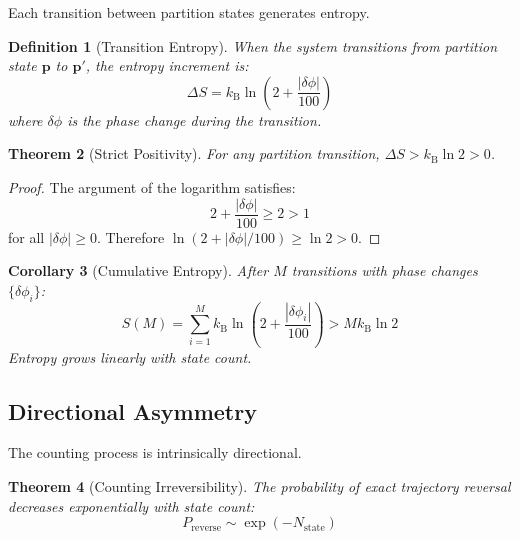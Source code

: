 \documentclass[twocolumn,10pt]{article}
\newtheorem{theorem}{Theorem}[section]
\newtheorem{corollary}[theorem]{Corollary}
\newtheorem{definition}[theorem]{Definition}
\newcommand{\kB}{k_{\mathrm{B}}}
\newcommand{\Nstate}{N_{\mathrm{state}}}
\begin{document}
Each transition between partition states generates entropy.

\begin{definition}[Transition Entropy]
\label{def:entropy}
When the system transitions from partition state $\mathbf{p}$ to $\mathbf{p}'$, the entropy increment is:
\begin{equation}
    \Delta S = \kB \ln\left(2 + \frac{|\delta\phi|}{100}\right)
\end{equation}
where $\delta\phi$ is the phase change during the transition.
\end{definition}

\begin{theorem}[Strict Positivity]
\label{thm:positive}
For any partition transition, $\Delta S > \kB \ln 2 > 0$.
\end{theorem}

\begin{proof}
The argument of the logarithm satisfies:
\begin{equation}
    2 + \frac{|\delta\phi|}{100} \geq 2 > 1
\end{equation}
for all $|\delta\phi| \geq 0$. Therefore $\ln(2 + |\delta\phi|/100) \geq \ln 2 > 0$.
\end{proof}

\begin{corollary}[Cumulative Entropy]
After $M$ transitions with phase changes $\{\delta\phi_i\}$:
\begin{equation}
    S(M) = \sum_{i=1}^{M} \kB \ln\left(2 + \frac{|\delta\phi_i|}{100}\right) > M \kB \ln 2
\end{equation}
Entropy grows linearly with state count.
\end{corollary}

\subsection{Directional Asymmetry}

The counting process is intrinsically directional.

\begin{theorem}[Counting Irreversibility]
\label{thm:irreversibility}
The probability of exact trajectory reversal decreases exponentially with state count:
\begin{equation}
    P_{\mathrm{reverse}} \sim \exp(-\Nstate)
\end{equation}
\end{theorem}
\end{document}
